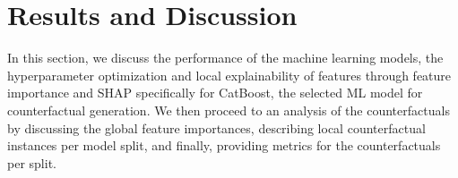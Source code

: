 \documentclass[pdflatex,sn-vancouver-num]{sn-jnl}
\begin{document}




\section{Results and Discussion}

In this section, we discuss the performance of the machine learning models, the hyperparameter optimization and local explainability of features through feature importance and SHAP specifically for CatBoost, the selected ML model for counterfactual generation. We then proceed to an analysis of the counterfactuals by discussing the  global feature importances, describing local counterfactual instances per model split, and finally, providing metrics for the counterfactuals per split.
\end{document}
